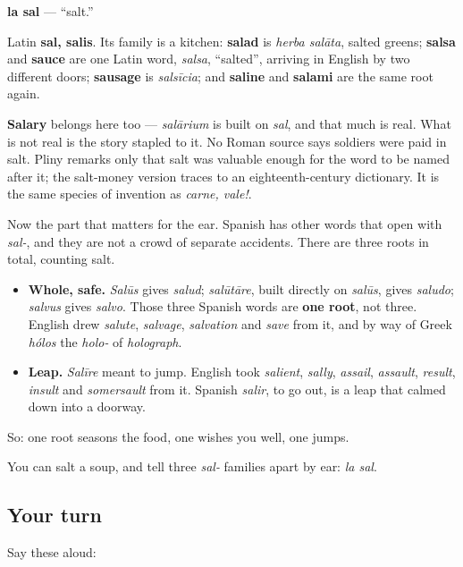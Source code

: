 \begin{cousinweb}
\textbf{la sal} — \textquotedblleft{}salt.\textquotedblright{}

Latin \textbf{sal, salis}. Its family is a kitchen: \textbf{salad} is \emph{herba salāta}, salted greens; \textbf{salsa} and \textbf{sauce} are one Latin word, \emph{salsa}, \textquotedblleft{}salted\textquotedblright{}, arriving in English by two different doors; \textbf{sausage} is \emph{salsīcia}; and \textbf{saline} and \textbf{salami} are the same root again.

\textbf{Salary} belongs here too — \emph{salārium} is built on \emph{sal}, and that much is real. What is not real is the story stapled to it. No Roman source says soldiers were paid in salt. Pliny remarks only that salt was valuable enough for the word to be named after it; the salt-money version traces to an eighteenth-century dictionary. It is the same species of invention as \emph{carne, vale!}.

Now the part that matters for the ear. Spanish has other words that open with \emph{sal-}, and they are not a crowd of separate accidents. There are three roots in total, counting salt.

\begin{itemize}
\raggedright
  \item \textbf{Whole, safe.} \emph{Salūs} gives \emph{salud}; \emph{salūtāre}, built directly on \emph{salūs}, gives \emph{saludo}; \emph{salvus} gives \emph{salvo}. Those three Spanish words are \textbf{one root}, not three. English drew \emph{salute}, \emph{salvage}, \emph{salvation} and \emph{save} from it, and by way of Greek \emph{hólos} the \emph{holo-} of \emph{holograph}.
  \item \textbf{Leap.} \emph{Salīre} meant to jump. English took \emph{salient}, \emph{sally}, \emph{assail}, \emph{assault}, \emph{result}, \emph{insult} and \emph{somersault} from it. Spanish \emph{salir}, to go out, is a leap that calmed down into a doorway.
\end{itemize}

So: one root seasons the food, one wishes you well, one jumps.
\end{cousinweb}

\begin{grammarlens}[title={What you've built}]
You can salt a soup, and tell three \emph{sal-} families apart by ear: \emph{la sal}.
\end{grammarlens}

\subsection*{Your turn}
Say these aloud:

